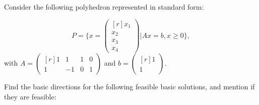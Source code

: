 Consider the following polyhedron represented in standard form:

\begin{equation*}
    P = \Bigg\{ x = \begin{pmatrix*}[r] x_1 \\ x_2 \\ x_3 \\ x_4 \end{pmatrix*} | Ax = b, x\geq0 \Bigg\},
\end{equation*}
with $A = \begin{pmatrix*}[r] 1 & 1 & 1 & 0 \\ 1 & -1 & 0 & 1 \end{pmatrix*}$ and $b = \begin{pmatrix*}[r] 1 \\ 1 \end{pmatrix*}$.

Find the basic directions for the following feasible basic solutions,
and mention if they are feasible:

